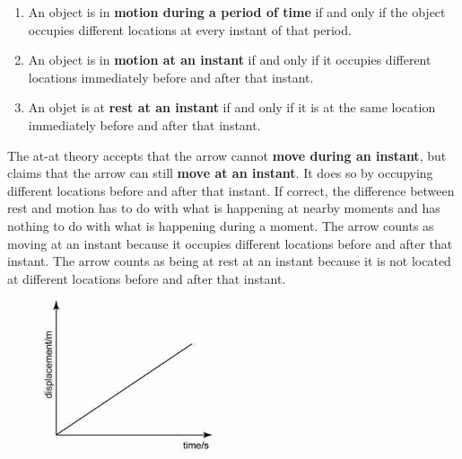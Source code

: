 \documentclass[oneside]{article}
\begin{document}
\begin{enumerate}
\item An object is in  \textbf{motion during a period of time} if and only if the object occupies different locations at every instant of that period.
\item An object is in \textbf{motion at an instant} if and only if it occupies different locations immediately before and after that instant. 
\item An objet is at  \textbf{rest at an instant} if and only if it is at the same location immediately before and after that instant. 
\end{enumerate}
The at-at theory accepts that the arrow cannot \textbf{move during an instant}, but claims that the arrow can still \textbf{move at an instant}. It does so by occupying different locations before and after that instant. If correct, the difference between rest and motion has to do with what is happening at nearby moments and has nothing to do with what is happening during a moment. The arrow counts as moving at an instant because it occupies different locations before and after that instant. The arrow counts as being at rest at an instant because it is not located at different locations before and after that instant.

\begin{figure}[h]
\centering
  \includegraphics[width=50mm]{graph.jpg}
\end{figure}






\end{document}
